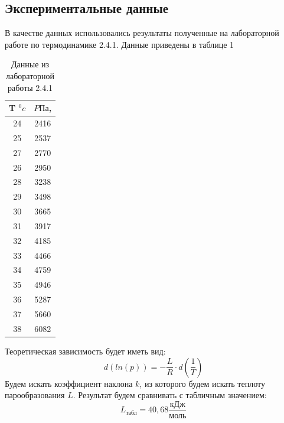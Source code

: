 \documentclass[a4paper,20pt]{article}
\theoremstyle{definition}
\begin{document}
\subsection{Экспериментальные данные}
В качестве данных использовались результаты полученные на лабораторной работе по термодинамике 2.4.1. Данные приведены в таблице 1
\begin{table}[H]
	\centering
	\begin{tabular}{|c|c|}
		\hline
		T  $^0c$& $P \text{Па}$, \\ \hline
		24 & 2416           \\ \hline
		25 & 2537       \\ \hline
		27 & 2770      \\ \hline
		26 & 2950  \\ \hline
		28 & 3238      \\ \hline
		29 & 3498      \\ \hline
		30 & 3665      \\ \hline
		31 & 3917      \\ \hline
		32 & 4185      \\ \hline
		33 & 4466      \\ \hline
		34 & 4759      \\ \hline
		35 & 4946      \\ \hline
		36 & 5287      \\ \hline
		37 & 5660      \\ \hline
		38 & 6082      \\ \hline
	\end{tabular}
	\caption{Данные из лабораторной работы 2.4.1}
	\label{tab:izm}

\end{table}
Теоретическая зависимость будет иметь вид:
\begin{equation}
	d(ln(p))= -\frac{L}{R}\cdot d(\frac{1}{T})
\end{equation}
Будем искать коэффициент наклона $k$, из которого будем искать теплоту парообразования $L$. Результат будем сравнивать с табличным значением:
\begin{equation}
	L_{\text{табл}} = 40,68 \frac{\text{кДж}}{\text{моль}}
\end{equation}
\end{document}
